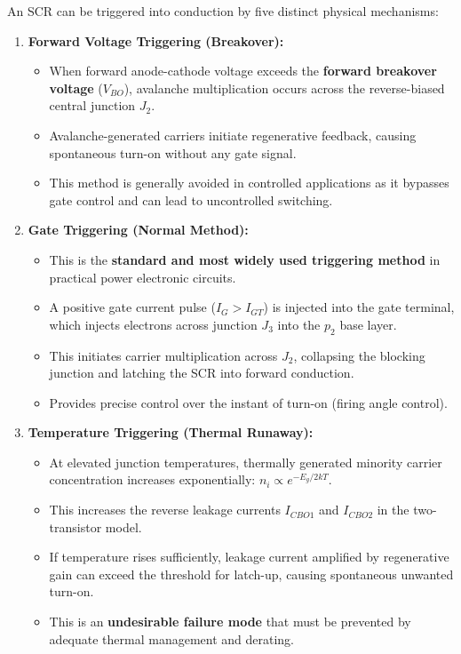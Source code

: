 \documentclass[11pt,a4paper]{article}
\begin{document}
\begin{conceptbox}
An SCR can be triggered into conduction by five distinct physical mechanisms:

\begin{enumerate}[leftmargin=*]
  \item \textbf{Forward Voltage Triggering (Breakover):}
  \begin{itemize}
    \item When forward anode-cathode voltage exceeds the \textbf{forward breakover voltage} ($V_{BO}$), avalanche multiplication occurs across the reverse-biased central junction $J_2$.
    \item Avalanche-generated carriers initiate regenerative feedback, causing spontaneous turn-on without any gate signal.
    \item This method is generally avoided in controlled applications as it bypasses gate control and can lead to uncontrolled switching.
  \end{itemize}

  \item \textbf{Gate Triggering (Normal Method):}
  \begin{itemize}
    \item This is the \textbf{standard and most widely used triggering method} in practical power electronic circuits.
    \item A positive gate current pulse ($I_G > I_{GT}$) is injected into the gate terminal, which injects electrons across junction $J_3$ into the $p_2$ base layer.
    \item This initiates carrier multiplication across $J_2$, collapsing the blocking junction and latching the SCR into forward conduction.
    \item Provides precise control over the instant of turn-on (firing angle control).
  \end{itemize}

  \item \textbf{Temperature Triggering (Thermal Runaway):}
  \begin{itemize}
    \item At elevated junction temperatures, thermally generated minority carrier concentration increases exponentially: $n_i \propto e^{-E_g / 2kT}$.
    \item This increases the reverse leakage currents $I_{CBO1}$ and $I_{CBO2}$ in the two-transistor model.
    \item If temperature rises sufficiently, leakage current amplified by regenerative gain can exceed the threshold for latch-up, causing spontaneous unwanted turn-on.
    \item This is an \textbf{undesirable failure mode} that must be prevented by adequate thermal management and derating.
  \end{itemize}


\end{enumerate}
\end{conceptbox}
\end{document}
